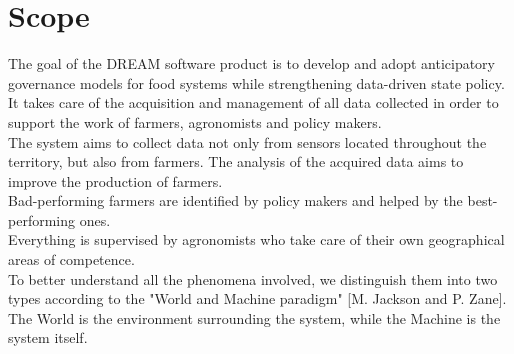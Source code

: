 \section{Scope}

The goal of the DREAM software product is to develop and adopt anticipatory governance models for food systems while strengthening data-driven state policy.\\
It takes care of the acquisition and management of all data collected in order to support the work of farmers, agronomists and policy makers.\\
The system aims to collect data not only from sensors located throughout the territory, but also from farmers. The analysis of the acquired data aims to improve the production of farmers.\\ Bad-performing farmers are identified by policy makers and helped by the best-performing ones.\\
Everything is supervised by agronomists who take care of their own geographical areas of competence.\\

To better understand all the phenomena involved, we distinguish them into two types according to the "World and Machine paradigm" [M. Jackson and P. Zane]. The World is the environment surrounding the system, while the Machine is the system itself.

